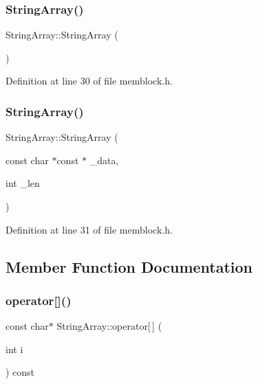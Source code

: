 \subsubsection{\texorpdfstring{String\+Array()}{StringArray()}\hspace{0.1cm}{\footnotesize\ttfamily [1/2]}}
{\footnotesize\ttfamily String\+Array\+::\+String\+Array (\begin{DoxyParamCaption}{ }\end{DoxyParamCaption})\hspace{0.3cm}{\ttfamily [inline]}}



Definition at line 30 of file memblock.\+h.

\mbox{\label{class_string_array_acfcc664e8488524390d9e2b9f7eacc60}} 
\subsubsection{\texorpdfstring{String\+Array()}{StringArray()}\hspace{0.1cm}{\footnotesize\ttfamily [2/2]}}
{\footnotesize\ttfamily String\+Array\+::\+String\+Array (\begin{DoxyParamCaption}\item[{const char $\ast$const $\ast$}]{\+\_\+data,  }\item[{int}]{\+\_\+len }\end{DoxyParamCaption})\hspace{0.3cm}{\ttfamily [inline]}}



Definition at line 31 of file memblock.\+h.



\subsection{Member Function Documentation}
\mbox{\label{class_string_array_a6fdb51881b6ab801341f3735980dc75e}} 
\subsubsection{\texorpdfstring{operator[]()}{operator[]()}}
{\footnotesize\ttfamily const char$\ast$ String\+Array\+::operator\mbox{[}$\,$\mbox{]} (\begin{DoxyParamCaption}\item[{int}]{i }\end{DoxyParamCaption}) const\hspace{0.3cm}{\ttfamily [inline]}}



